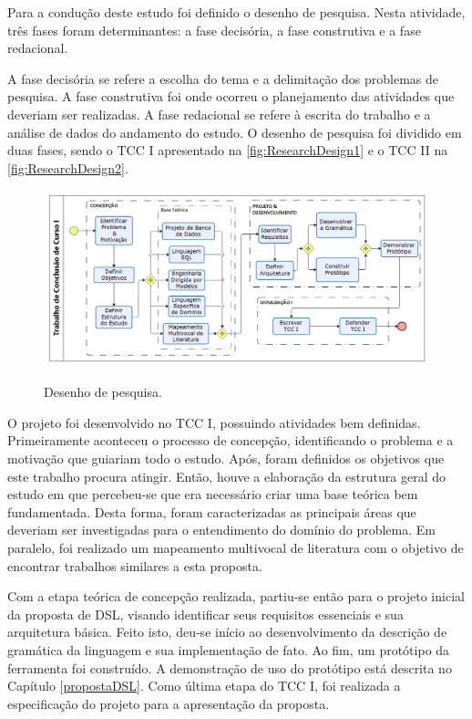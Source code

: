 Para a condução deste estudo foi definido o desenho de pesquisa. 
Nesta atividade, três fases foram determinantes: a fase decisória, a fase construtiva e a fase redacional.

A fase decisória se refere a escolha do tema e a delimitação dos problemas de pesquisa. 
A fase construtiva foi onde ocorreu o planejamento das atividades que deveriam ser realizadas. 
A fase redacional se refere à escrita do trabalho e a análise de dados do andamento do estudo. O desenho de pesquisa foi dividido em duas fases, sendo o \ac{TCC} I apresentado na \autoref{fig:ResearchDesign1} e o \ac{TCC} II na \autoref{fig:ResearchDesign2}.

\begin{figure}[!htb]
	\centering
	\caption{Desenho de pesquisa.}
		\includegraphics[width=1\textwidth]{img/DesenhoPesquisa1.png}
	\label{fig:ResearchDesign1}
\end{figure}

O projeto foi desenvolvido no \ac{TCC} I, possuindo atividades bem definidas. 
Primeiramente aconteceu o processo de concepção, identificando o problema e a motivação que guiariam todo o estudo. 
Após, foram definidos os objetivos que este trabalho procura atingir. 
Então, houve a elaboração da estrutura geral do estudo em que percebeu-se que era necessário criar uma base teórica bem fundamentada. 
Desta forma, foram caracterizadas as principais áreas que deveriam ser investigadas para o entendimento do domínio do problema. 
Em paralelo, foi realizado um mapeamento multivocal de literatura com o objetivo de encontrar trabalhos similares a esta proposta. 

Com a etapa teórica de concepção realizada, partiu-se então para o projeto inicial da proposta de \ac{DSL}, visando identificar seus requisitos essenciais e sua arquitetura básica. 
Feito isto, deu-se início ao desenvolvimento da descrição de gramática da linguagem e sua implementação de fato. 
Ao fim, um protótipo da ferramenta foi construído. 
A demonstração de uso do protótipo está descrita no Capítulo \autoref{propostaDSL}. 
Como última etapa do \ac{TCC} I, foi realizada a especificação do projeto para a apresentação da proposta.

